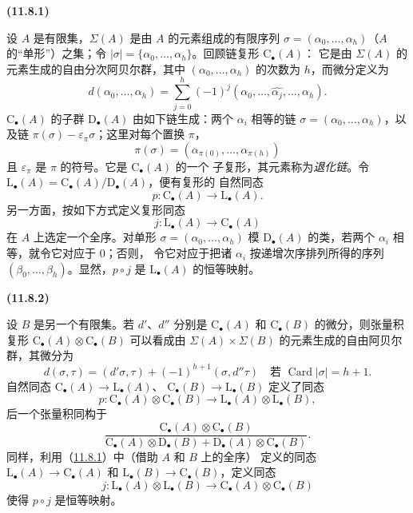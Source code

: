\documentclass[UTF8,fontset=none,11pt,oneside,openany]{ctexbook}
\newenvironment{env}[1][]{%
  \par\medskip\noindent\textbf{(#1)}\ %
}{\par}
\let\EGAOriginalLabel\label
\renewcommand{\label}[1]{\phantomsection\EGAOriginalLabel{#1}}
\begin{document}
\begin{env}[11.8.1]
\label{0.11.8.1-fr}
设 $A$ 是有限集，$\Sigma(A)$ 是由 $A$ 的元素组成的有限序列
$\sigma=(\alpha_0,\ldots,\alpha_h)$（$A$ 的“单形”）之集；令
$|\sigma|=\{\alpha_0,\ldots,\alpha_h\}$。回顾链复形 $\mathrm C_\bullet(A)$：
它是由 $\Sigma(A)$ 的元素生成的自由分次阿贝尔群，其中
$(\alpha_0,\ldots,\alpha_h)$ 的次数为 $h$，而微分定义为
\[
d(\alpha_0,\ldots,\alpha_h)=
\sum_{j=0}^{h}(-1)^j
(\alpha_0,\ldots,\widehat{\alpha_j},\ldots,\alpha_h).
\]
$\mathrm C_\bullet(A)$ 的子群 $\mathrm D_\bullet(A)$ 由如下链生成：两个
$\alpha_i$ 相等的链 $\sigma=(\alpha_0,\ldots,\alpha_h)$，以及链
$\pi(\sigma)-\varepsilon_\pi\sigma$；这里对每个置换 $\pi$，
\[
\pi(\sigma)=(\alpha_{\pi(0)},\ldots,\alpha_{\pi(h)})
\]
且 $\varepsilon_\pi$ 是 $\pi$ 的符号。它是 $\mathrm C_\bullet(A)$ 的一个
子复形，其元素称为\emph{退化链}。令
$\mathrm L_\bullet(A)=\mathrm C_\bullet(A)/\mathrm D_\bullet(A)$，便有复形的
自然同态
\[
p:\mathrm C_\bullet(A)\longrightarrow\mathrm L_\bullet(A).
\]
另一方面，按如下方式定义复形同态
\[
j:\mathrm L_\bullet(A)\longrightarrow\mathrm C_\bullet(A)
\]
在 $A$ 上选定一个全序。对单形 $\sigma=(\alpha_0,\ldots,\alpha_h)$ 模
$\mathrm D_\bullet(A)$ 的类，若两个 $\alpha_i$ 相等，就令它对应于 $0$；否则，
令它对应于把诸 $\alpha_i$ 按递增次序排列所得的序列
$(\beta_0,\ldots,\beta_h)$。显然，$p\circ j$ 是 $\mathrm L_\bullet(A)$ 的恒等映射。
\end{env}

\begin{env}[11.8.2]
\label{0.11.8.2-fr}
设 $B$ 是另一个有限集。若 $d'$、$d''$ 分别是 $\mathrm C_\bullet(A)$ 和
$\mathrm C_\bullet(B)$ 的微分，则张量积复形
$\mathrm C_\bullet(A)\otimes\mathrm C_\bullet(B)$ 可以看成由
$\Sigma(A)\times\Sigma(B)$ 的元素生成的自由阿贝尔群，其微分为
\[
d(\sigma,\tau)=(d'\sigma,\tau)+(-1)^{h+1}(\sigma,d''\tau)
\quad\text{若 }\operatorname{Card}|\sigma|=h+1.
\]
自然同态 $\mathrm C_\bullet(A)\to\mathrm L_\bullet(A)$、
$\mathrm C_\bullet(B)\to\mathrm L_\bullet(B)$ 定义了同态
\[
p:\mathrm C_\bullet(A)\otimes\mathrm C_\bullet(B)
\longrightarrow\mathrm L_\bullet(A)\otimes\mathrm L_\bullet(B),
\]
后一个张量积同构于
\[
\frac{\mathrm C_\bullet(A)\otimes\mathrm C_\bullet(B)}
{\mathrm C_\bullet(A)\otimes\mathrm D_\bullet(B)
+\mathrm D_\bullet(A)\otimes\mathrm C_\bullet(B)}.
\]
同样，利用（\hyperref[0.11.8.1-fr]{11.8.1}）中（借助 $A$ 和 $B$ 上的全序）
定义的同态 $\mathrm L_\bullet(A)\to\mathrm C_\bullet(A)$ 和
$\mathrm L_\bullet(B)\to\mathrm C_\bullet(B)$，定义同态
\[
j:\mathrm L_\bullet(A)\otimes\mathrm L_\bullet(B)
\longrightarrow\mathrm C_\bullet(A)\otimes\mathrm C_\bullet(B)
\]
使得 $p\circ j$ 是恒等映射。
\end{env}
\end{document}
